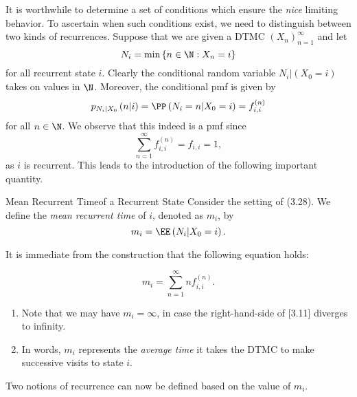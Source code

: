 \documentclass[stat333]{subfiles}
\begin{document}
    It is worthwhile to determine a set of conditions which ensure the \textit{nice} limiting behavior. To ascertain when such conditions exist, we need to distinguish between two kinds of recurrences. Suppose that we are given a DTMC $\left( X_{n} \right)^{\infty}_{n=1}$ and let
    \begin{equation*}
        N_i = \min\left\lbrace n\in\N: X_n=i \right\rbrace
    \end{equation*}
    for all recurrent state $i$. Clearly the conditional random variable $N_i|\left( X_0=i \right)$ takes on values in $\N$. Moreover, the conditional pmf is given by
    \begin{equation*}
        p_{N_i|X_0}\left( n|i \right) = \PP\left( N_i=n|X_0=i \right) = f^{\left( n \right)}_{i,i}
    \end{equation*}
    for all $n\in\N$. We observe that this indeed is a pmf since
    \begin{equation*}
        \sum^{\infty}_{n=1} f^{\left( n \right)}_{i,i} = f_{i,i} = 1,
    \end{equation*}
    as $i$ is recurrent. This leads to the introduction of the following important quantity.

    \begin{definition}{Mean Recurrent Time}{of a Recurrent State}
        Consider the setting of (3.28). We define the \emph{mean recurrent time} of $i$, denoted as $m_i$, by
        \begin{equation*}
            m_i = \EE\left( N_i|X_0=i \right).
        \end{equation*}
    \end{definition}

    \noindent It is immediate from the construction that the following equation holds:
    \begin{eqbox}
        \begin{equation}
            m_i = \sum^{\infty}_{n=1} nf^{\left( n \right)}_{i,i}.
        \end{equation}
    \end{eqbox} 
    \begin{enumerate}
        \item Note that we may have $m_i=\infty$, in case the right-hand-side of [3.11] diverges to infinity. 
        \item In words, $m_i$ represents the \textit{average time} it takes the DTMC to make successive visits to state $i$. 
    \end{enumerate}
    Two notions of recurrence can now be defined based on the value of $m_i$.
\end{document}
